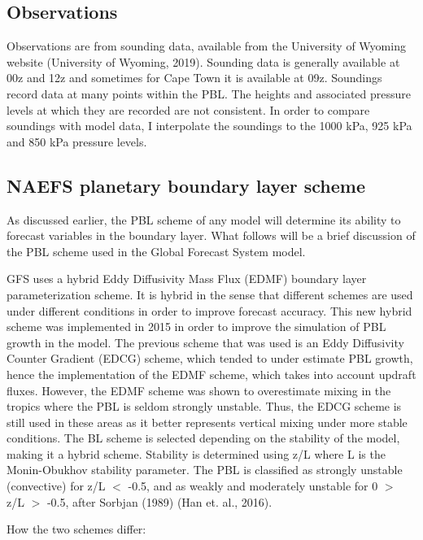 \documentclass[12pt]{article}
\begin{document}
\subsection{Observations}

Observations are from sounding data, available from the University of Wyoming website 
(University of Wyoming, 2019).  Sounding data is generally available at 00z and 12z and 
sometimes for Cape Town it is available at 09z. Soundings record data at many points within 
the PBL. The heights and associated pressure levels at which they are recorded are not 
consistent. In order to compare soundings with model data, I interpolate the soundings 
to the 1000 kPa, 925 kPa and 850 kPa pressure levels. 






\subsection{NAEFS planetary boundary layer scheme}

As discussed earlier, the PBL scheme of any model will determine its ability to forecast 
variables in the boundary layer. What follows will be a brief discussion of the PBL scheme 
used in the Global Forecast System model. 

GFS uses a hybrid Eddy Diffusivity Mass Flux (EDMF) boundary layer parameterization scheme. 
It is hybrid in the sense that different schemes are used under different conditions in 
order to improve forecast accuracy.  This new hybrid scheme was implemented in 2015 in 
order to improve the simulation of PBL growth in the model. The previous scheme that was 
used is an Eddy Diffusivity Counter Gradient (EDCG) scheme, which tended to under estimate 
PBL growth, hence the implementation of the EDMF scheme, which takes into account updraft 
fluxes. However, the EDMF scheme was shown to overestimate mixing in the tropics where the 
PBL is seldom strongly unstable. Thus, the EDCG scheme is still used in these areas as it 
better represents vertical mixing under more stable conditions. The BL scheme is selected 
depending on the stability of the model, making it a hybrid scheme. Stability is determined 
using z/L where L is the Monin-Obukhov stability parameter. The PBL is classified as 
strongly unstable (convective) for z/L $<$ -0.5, and as weakly and moderately unstable 
for 0 $>$ z/L $>$ -0.5, after Sorbjan (1989) (Han et. al., 2016). 


How the two schemes differ:
\end{document}
